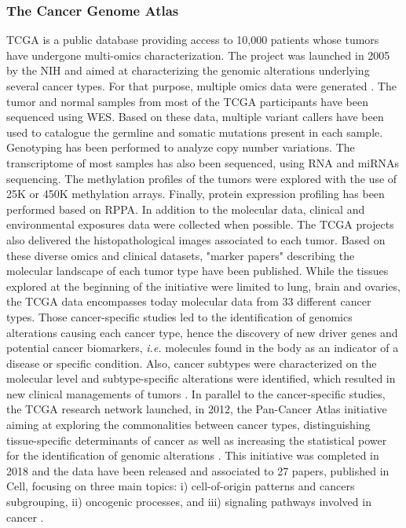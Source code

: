 \subsubsection*{The Cancer Genome Atlas}
\gls{TCGA} is a public database providing access to 10,000 patients whose tumors have undergone multi-omics characterization. The project was launched in 2005 by the \gls{NIH} and aimed at characterizing the genomic alterations underlying several cancer types. For that purpose, multiple omics data were generated \cite{Tomczak2015}. The tumor and normal samples from most of the \gls{TCGA} participants have been sequenced using \gls{WES}. Based on these data, multiple variant callers have been used to catalogue the germline and somatic mutations present in each sample. Genotyping has been performed to analyze copy number variations. The transcriptome of most samples has also been sequenced, using \gls*{RNA} and \gls{miRNAs} sequencing. The methylation profiles of the tumors were explored with the use of 25K or 450K methylation arrays. Finally, protein expression profiling has been performed based on \gls{RPPA}. In addition to the molecular data, clinical and environmental exposures data were collected when possible. The \gls{TCGA} projects also delivered the histopathological images associated to each tumor. Based on these diverse omics and clinical datasets, "marker papers" describing the molecular landscape of each tumor type have been published. While the tissues explored at the beginning of the initiative were limited to lung, brain and ovaries, the \gls{TCGA} data encompasses today molecular data from 33 different cancer types. Those cancer-specific studies led to the identification of genomics alterations causing each cancer type, hence the discovery of new driver genes and potential cancer biomarkers, \textit{i.e.} molecules found in the body as an indicator of a disease or specific condition. Also, cancer subtypes were characterized on the molecular level and subtype-specific alterations were identified, which resulted in new clinical managements of tumors \cite{Weinstein2013}. In parallel to the cancer-specific studies, the \gls{TCGA} research network launched, in 2012, the Pan-Cancer Atlas initiative aiming at exploring the commonalities between cancer types, distinguishing tissue-specific determinants of cancer as well as increasing the statistical power for the identification of genomic alterations \cite{Weinstein2013}. This initiative was completed in 2018 and the data have been released and associated to 27 papers, published in Cell, focusing on three main topics: i) cell-of-origin patterns and cancers subgrouping, ii) oncogenic processes, and iii) signaling pathways involved in cancer \cite{PanCanatlas_site}. 

